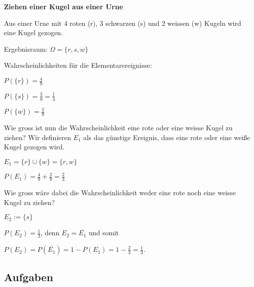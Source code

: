 \begin{beispiel}{}{}\textbf{Ziehen einer Kugel aus einer Urne}

Aus einer Urne mit 4 roten (r), 3 schwarzen (s) und 2 weissen (w) Kugeln wird eine Kugel gezogen.

Ergebnisraum: $\Omega = \{r, s, w\}$



Wahrscheinlichkeiten für die Elementarereignisse:

$P(\{r\}) = \frac49$

$P(\{s\}) = \frac39 = \frac13$

$P(\{w\}) = \frac29$

Wie gross ist nun die Wahrscheinlichkeit eine rote oder eine weisse Kugel zu ziehen?
Wir definieren $E_1$ als das günstige Ereignis, dass eine rote oder eine weiße Kugel gezogen wird.

$E_1 = \{r\} \cup \{w\} = \{r,w\}$

$P(E_1) = \frac49 + \frac29 = \frac23$



Wie gross wäre dabei die Wahrscheinlichkeit weder eine rote noch eine weisse Kugel zu ziehen?

$E_2 := \{s\}$

$P(E_2) = \frac13$, denn $E_2 = \overline{E_1}$ und somit

$P(E_2) = P(\overline{E_1}) = 1 - P(E_1) = 1 - \frac23 = \frac13$.

\end{beispiel}

\subsection*{Aufgaben}

\newpage


